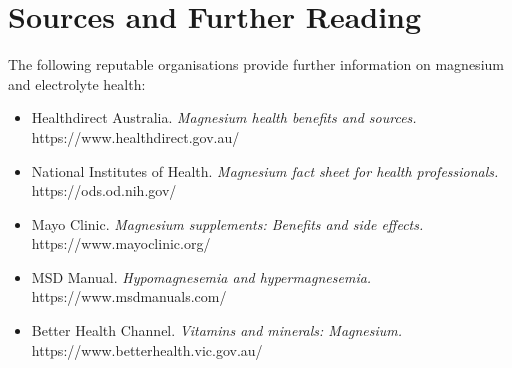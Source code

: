 \section*{Sources and Further Reading}
The following reputable organisations provide further information on magnesium and electrolyte health:
\begin{itemize}
    \item Healthdirect Australia. \textit{Magnesium health benefits and sources.} https://www.healthdirect.gov.au/
    \item National Institutes of Health. \textit{Magnesium fact sheet for health professionals.} https://ods.od.nih.gov/
    \item Mayo Clinic. \textit{Magnesium supplements: Benefits and side effects.} https://www.mayoclinic.org/
    \item MSD Manual. \textit{Hypomagnesemia and hypermagnesemia.} https://www.msdmanuals.com/
    \item Better Health Channel. \textit{Vitamins and minerals: Magnesium.} https://www.betterhealth.vic.gov.au/
\end{itemize}
